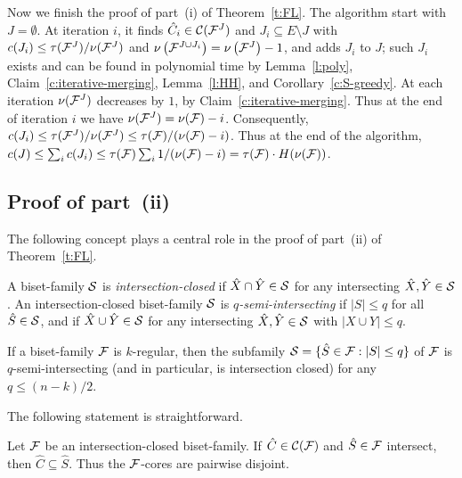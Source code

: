 Now we finish the proof of part~(i) of Theorem~\ref{t:FL}.
The algorithm start with $J=\emptyset$.
At iteration $i$, it finds $\hat{C}_i \in {\cal C}({\cal F}^J)$ and $J_i \subseteq E \setminus J$ with 
$c(J_i) \leq \tau({\cal F}^J)/\nu({\cal F}^J)$ and 
$\nu\left({\cal F}^{J \cup J_i}\right)=\nu\left({\cal F}^J\right)-1$, and adds $J_i$ to $J$; 
such $J_i$ exists and can be found in polynomial time by 
Lemma~\ref{l:poly},
Claim~\ref{c:iterative-merging},
Lemma~\ref{l:HH}, and
Corollary~\ref{c:S-greedy}.
At each iteration $\nu({\cal F}^J)$ decreases by $1$, by Claim~\ref{c:iterative-merging}.
Thus at the end of iteration $i$ we have $\nu({\cal F}^J)=\nu({\cal F})-i$.
Consequently, $c(J_i) \leq \tau({\cal F}^J)/\nu({\cal F}^J) \leq \tau({\cal F})/(\nu({\cal F})-i)$.
Thus at the end of the algorithm, 
$c(J) \leq \sum_i c(J_i) \leq \tau({\cal F}) \sum_i 1/(\nu({\cal F})-i) = \tau({\cal F}) \cdot H(\nu({\cal F}))$.

\subsection{Proof of part~(ii)} \label{s:main}

The following concept plays a central role in the proof of part~(ii) of Theorem~\ref{t:FL}.

\begin{definition} \label{d:q}
A biset-family ${\cal S}$ is {\em intersection-closed} if $\hat{X} \cap \hat{Y} \in {\cal S}$
for any intersecting $\hat{X},\hat{Y} \in {\cal S}$.
An intersection-closed biset-family ${\cal S}$ is {\em $q$-semi-intersecting} if 
$|S| \leq q$ for all $\hat{S} \in {\cal S}$, and if 
$\hat{X} \cup \hat{Y} \in {\cal S}$ for any intersecting $\hat{X},\hat{Y} \in {\cal S}$ with $|X \cup Y| \leq q$.
\end{definition}



\begin{fact} \label{f:q}
If a biset-family ${\cal F}$ is $k$-regular, then the subfamily 
${\cal S}=\{\hat{S} \in {\cal F}: |S| \leq q\}$ of ${\cal F}$ is $q$-semi-intersecting 
(and in particular, is intersection closed) for any $q \leq (n-k)/2$.
\end{fact}


The following statement is straightforward.

\begin{lemma} \label{l:HC}
Let ${\cal F}$ be an intersection-closed biset-family.
If $\hat{C} \in {\cal C}({\cal F})$ and $\hat{S} \in {\cal F}$ intersect, then $\hat{C} \subseteq \hat{S}$.
Thus the ${\cal F}$-cores are pairwise disjoint.
\end{lemma}

